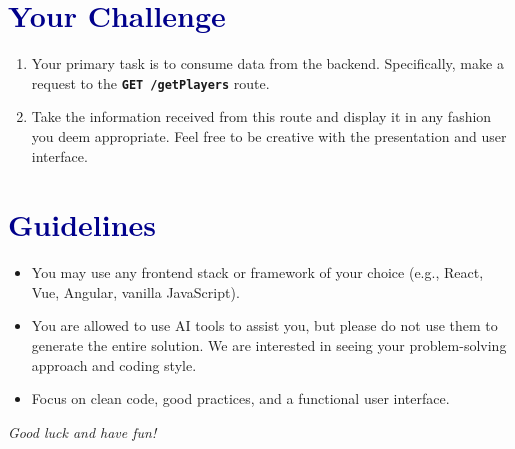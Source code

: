 \documentclass[10pt, a4paper]{article}
\begin{document}
\section*{\textcolor{darkblue}{Your Challenge}}
\begin{enumerate}[label=\arabic*., leftmargin=*, itemsep=0.5em]
    \item Your primary task is to consume data from the backend. Specifically, make a request to the \textbf{\texttt{GET /getPlayers}} route.
    \item Take the information received from this route and display it in any fashion you deem appropriate. Feel free to be creative with the presentation and user interface.
\end{enumerate}

\section*{\textcolor{darkblue}{Guidelines}}
\begin{itemize}[label=\textbullet, leftmargin=*, itemsep=0.5em]
    \item You may use any frontend stack or framework of your choice (e.g., React, Vue, Angular, vanilla JavaScript).
    \item You are allowed to use AI tools to assist you, but please do not use them to generate the entire solution. We are interested in seeing your problem-solving approach and coding style.
    \item Focus on clean code, good practices, and a functional user interface.
\end{itemize}

\vspace{1cm}
\begin{center}
    \textit{Good luck and have fun!}
\end{center}
\end{document}
